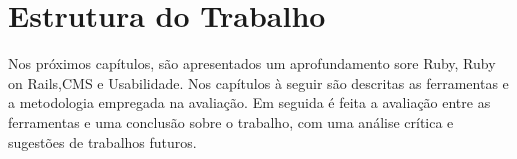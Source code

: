 \chapter{Estrutura do Trabalho}

Nos próximos capítulos, são apresentados um aprofundamento sore Ruby, Ruby on Rails,CMS e Usabilidade. Nos capítulos à seguir são descritas as ferramentas e a metodologia empregada na avaliação. Em seguida é feita a avaliação entre as ferramentas e uma conclusão sobre o trabalho, com uma análise crítica e sugestões de trabalhos futuros.



